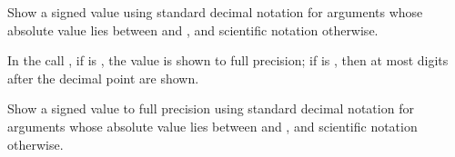 \begin{haddockdesc}
\item[\begin{tabular}{@{}l}
showGFloat :: RealFloat a => Maybe Int -> a -> ShowS
\end{tabular}]
{\haddockbegindoc
Show a signed  value
 using standard decimal notation for arguments whose absolute value lies
 between  and , and scientific notation otherwise.\par
In the call , if  is ,
 the value is shown to full precision; if  is ,
 then at most  digits after the decimal point are shown.\par}
\end{haddockdesc}
\begin{haddockdesc}
\item[\begin{tabular}{@{}l}
showFloat :: RealFloat a => a -> ShowS
\end{tabular}]
{\haddockbegindoc
Show a signed  value to full precision
 using standard decimal notation for arguments whose absolute value lies
 between  and , and scientific notation otherwise.\par}
\end{haddockdesc}
